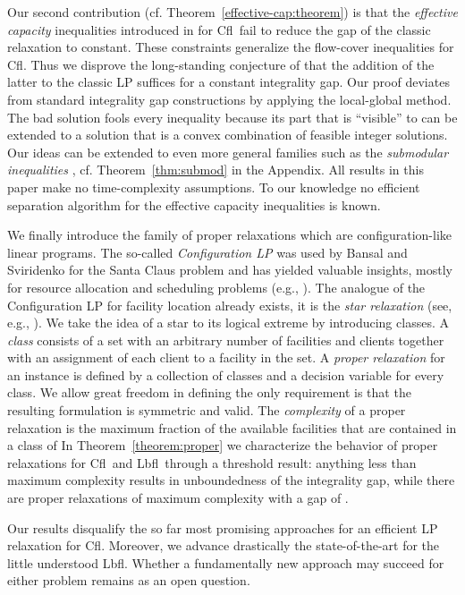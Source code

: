 \documentclass[11pt]{article}
\newcommand{\lbfl}{{\sc Lbfl}}
\newcommand{\cfl}{{\sc Cfl}}
\begin{document}
Our second contribution (cf. Theorem~\ref{effective-cap:theorem})
is that the \emph{effective capacity}
inequalities introduced in \cite{AardalPW95,AardalPW95er} for \cfl\ 
fail to reduce the gap of the classic relaxation to constant. 
These constraints generalize the flow-cover inequalities for
\cfl. Thus  we disprove the long-standing conjecture of \cite{LeviSS12} 
that the addition of the latter to the classic LP 
suffices for  a constant integrality gap. 
Our proof deviates from standard integrality gap constructions 
by applying the local-global method.  
The bad solution fools every inequality   because its part that is
``visible'' to  can be extended to a solution  that is a
convex combination of feasible integer solutions. 
Our  ideas can be extended 
to even more general families
such as the  {\em submodular inequalities} \cite{AardalPW95}, cf. 
Theorem~\ref{thm:submod}
in the Appendix. 
All results  in this paper make no time-complexity assumptions. To our
knowledge no efficient separation algorithm for the effective
capacity inequalities is known.

We finally  introduce    
the family of  proper relaxations
which are  configuration-like linear programs.
The so-called \emph{Configuration LP} was  used by 
Bansal and Sviridenko 
\cite{BansalS06} for the Santa Claus problem and has yielded valuable insights, mostly
for resource allocation  and scheduling problems
(e.g., \cite{Svensson12}).
 The analogue of the Configuration
LP for facility location already exists, it is the {\em star
  relaxation} (see, e.g., \cite{JainMMSV03}).
We take the idea of a star  to its logical  extreme by 
introducing  classes. 
A {\em class} consists of a set with an arbitrary number of facilities and clients
together with an assignment of each client to a facility in the set. 
A {\em proper relaxation} for an instance is defined by a collection
 of classes and a decision variable for every class. 
We allow great freedom in 
defining   
the only requirement   is that the resulting
formulation is symmetric and valid. 
The {\em complexity } of a proper relaxation is the maximum fraction
 of the 
available facilities that are contained in a class of 
In Theorem~\ref{theorem:proper}  we 
characterize the  behavior of proper relaxations  
for \cfl\ and \lbfl\ through a threshold result: 
anything less than maximum complexity results in unboundedness of
the integrality gap, while there are
proper relaxations of maximum complexity with a gap of
.

Our  results disqualify  the  so far most promising approaches 
 for an efficient LP relaxation
for  \cfl. Moreover, we advance drastically the state-of-the-art for the
little understood \lbfl. 
Whether a fundamentally new approach
may succeed for either problem remains as an open question. 
\end{document}
